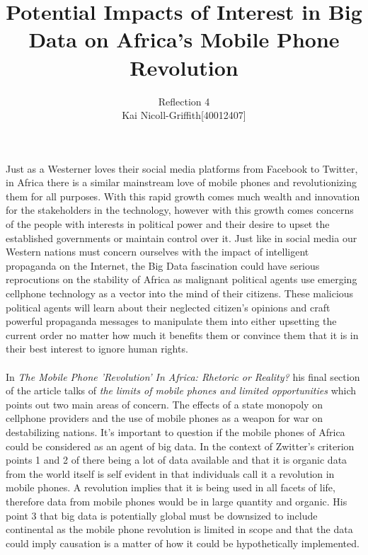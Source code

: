 \documentclass[fleqn, 12pt,letterpaper]{article}
\title{Potential Impacts of Interest in Big Data on Africa's Mobile Phone Revolution}
\author{Reflection 4 \\Kai Nicoll-Griffith[40012407]}
\begin{document}
	\maketitle
	
	
\hspace*{10mm} Just as a Westerner loves their social media platforms from Facebook to Twitter, in Africa there is a similar mainstream love of mobile phones and revolutionizing them for all purposes. With this rapid growth comes much wealth and innovation for the stakeholders in the technology, however with this growth comes concerns of the people with interests in political power and their desire to upset the established governments or maintain control over it. Just like in social media our Western nations must concern ourselves with the impact of intelligent propaganda on the Internet, the Big Data fascination could have serious reprocutions on the stability of Africa as malignant political agents use emerging cellphone technology as a vector into the mind of their citizens. These malicious political agents will learn about their neglected citizen's opinions and craft powerful propaganda messages to manipulate them into either upsetting the current order no matter how much it benefits them or convince them that it is in their best interest to ignore human rights. \\
	\\
\hspace*{10mm} 
In \textit{The Mobile Phone 'Revolution' In Africa: Rhetoric or Reality?} his final section of the article talks of \textit{the limits of mobile phones and limited opportunities} which points out two main areas of concern. The effects of a state monopoly on cellphone providers and the use of mobile phones as a weapon for war on destabilizing nations. It's important to question if the mobile phones of Africa could be considered as an agent of big data. In the context of Zwitter's criterion points 1 and 2 of there being a lot of data available and that it is organic data from the world itself is self evident in that individuals call it a revolution in mobile phones. A revolution implies that it is being used in all facets of life, therefore data from mobile phones would be in large quantity and organic. His point 3 that big data is potentially global must be downsized to include continental as the mobile phone revolution is limited in scope and that the data could imply causation is a matter of how it could be hypothetically implemented.\\
\end{document}
